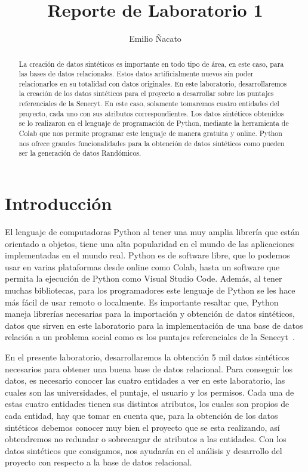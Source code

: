 \documentclass[10pt, oneside,spanish]{article}   	%
\title{Reporte de Laboratorio 1}
\author[L00400725]{Emilio Ñacato}
\affil[ ]{Universidad de las Fuerzas Armadas}
\affil[ ]{ejnacato@espe.edu.ec}
\affil[ ]{}
\affil[ ]{Tema: Creación de datos sintéticos}
\date{}							%
\begin{document}
\maketitle

\begin{abstract}
La creación de datos sintéticos es importante en todo tipo de área, en este caso, para las bases de datos relacionales. Estos datos artificialmente nuevos sin poder relacionarlos en su totalidad con datos originales. En este laboratorio, desarrollaremos la creación de los datos sintéticos para el proyecto a desarrollar sobre los puntajes referenciales de la Senecyt. En este caso, solamente tomaremos cuatro entidades del proyecto, cada uno con sus atributos correspondientes. Los datos sintéticos obtenidos se lo realizaron en el lenguaje de programación de Python, mediante la herramienta de Colab que nos permite programar este lenguaje de manera gratuita y online. Python nos ofrece grandes funcionalidades para la obtención de datos sintéticos como pueden ser la generación de datos Randómicos. 
\end{abstract}

\section{Introducción}
El lenguaje de computadoras Python al tener una muy amplia librería que están orientado a objetos, tiene una alta popularidad en el mundo de las aplicaciones implementadas en el mundo real. Python es de software libre, que lo podemos usar en varias plataformas desde online como Colab, hasta un software que permita la ejecución de Python como Visual Studio Code. Además, al tener muchas bibliotecas, para los programadores este lenguaje de Python se les hace más fácil de usar remoto o localmente. Es importante resaltar que, Python maneja librerías necesarias para la importación y obtención de datos sintéticos, datos que sirven en este laboratorio para la implementación de una base de datos relación a un problema social como es los puntajes referenciales de la Senecyt~\cite{herrera}. 

En el presente laboratorio, desarrollaremos la obtención 5 mil datos sintéticos necesarios para obtener una buena base de datos relacional. Para conseguir los datos, es necesario conocer las cuatro entidades a ver en este laboratorio, las cuales son las universidades, el puntaje, el usuario y los permisos. Cada una de estas cuatro entidades tienen sus distintos atributos, los cuales son propios de cada entidad, hay que tomar en cuenta que, para la obtención de los datos sintéticos debemos conocer muy bien el proyecto que se esta realizando, así obtendremos no redundar o sobrecargar de atributos a las entidades. Con los datos sintéticos que consigamos, nos ayudarán en el análisis y desarrollo del proyecto con respecto a la base de datos relacional.  
\end{document}
